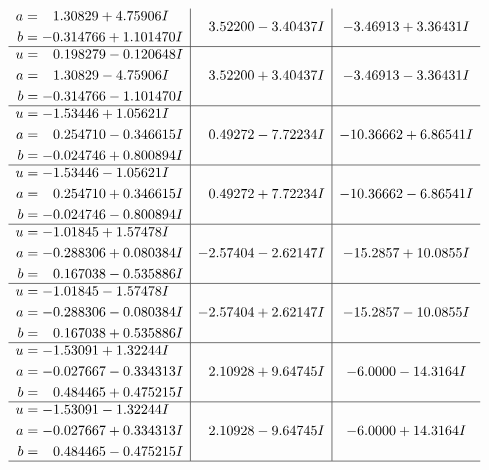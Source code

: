 \documentclass[1p]{elsarticle_modified}
\theoremstyle{definition}
\begin{document}
$$\begin{array}{c|c|c}
\begin{aligned}
a &= \phantom{-}1.30829 + 4.75906 I \\
b &= -0.314766 + 1.101470 I\end{aligned}
 & \phantom{-}3.52200 - 3.40437 I & -3.46913 + 3.36431 I \\ \hline\begin{aligned}
u &= \phantom{-}0.198279 - 0.120648 I \\
a &= \phantom{-}1.30829 - 4.75906 I \\
b &= -0.314766 - 1.101470 I\end{aligned}
 & \phantom{-}3.52200 + 3.40437 I & -3.46913 - 3.36431 I \\ \hline\begin{aligned}
u &= -1.53446 + 1.05621 I \\
a &= \phantom{-}0.254710 - 0.346615 I \\
b &= -0.024746 + 0.800894 I\end{aligned}
 & \phantom{-}0.49272 - 7.72234 I & -10.36662 + 6.86541 I \\ \hline\begin{aligned}
u &= -1.53446 - 1.05621 I \\
a &= \phantom{-}0.254710 + 0.346615 I \\
b &= -0.024746 - 0.800894 I\end{aligned}
 & \phantom{-}0.49272 + 7.72234 I & -10.36662 - 6.86541 I \\ \hline\begin{aligned}
u &= -1.01845 + 1.57478 I \\
a &= -0.288306 + 0.080384 I \\
b &= \phantom{-}0.167038 - 0.535886 I\end{aligned}
 & -2.57404 - 2.62147 I & -15.2857 + 10.0855 I \\ \hline\begin{aligned}
u &= -1.01845 - 1.57478 I \\
a &= -0.288306 - 0.080384 I \\
b &= \phantom{-}0.167038 + 0.535886 I\end{aligned}
 & -2.57404 + 2.62147 I & -15.2857 - 10.0855 I \\ \hline\begin{aligned}
u &= -1.53091 + 1.32244 I \\
a &= -0.027667 - 0.334313 I \\
b &= \phantom{-}0.484465 + 0.475215 I\end{aligned}
 & \phantom{-}2.10928 + 9.64745 I & -6.0000 - 14.3164 I \\ \hline\begin{aligned}
u &= -1.53091 - 1.32244 I \\
a &= -0.027667 + 0.334313 I \\
b &= \phantom{-}0.484465 - 0.475215 I\end{aligned}
 & \phantom{-}2.10928 - 9.64745 I & -6.0000 + 14.3164 I\\
 \hline 
 \end{array}$$\newpage\newpage\renewcommand{\arraystretch}{1}
\end{document}
